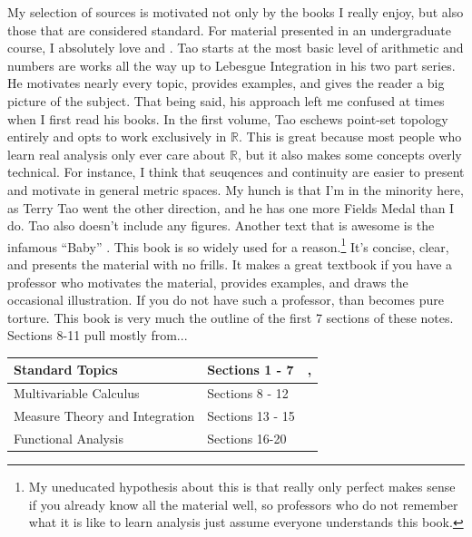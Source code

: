 \documentclass{article}
\newcommand{\R}{\mathbb{R}}
\theoremstyle{definition}
\begin{document}
	
	My selection of sources is motivated not only by the books I really enjoy, but also those that are considered standard. For material presented in an undergraduate course, I absolutely love \cite{tao2006analysis} and \cite{tao2009analysis}. Tao starts at the most basic level of arithmetic and numbers are works all the way up to Lebesgue Integration in his two part series. He motivates nearly every topic, provides examples, and gives the reader a big picture of the subject. That being said, his approach left me confused at times when I first read his books. In the first volume, Tao eschews point-set topology entirely and opts to work exclusively in $ \R $. This is great because most people who learn real analysis only ever care about $ \R $, but it also makes some concepts overly technical. For instance, I think that seuqences and continuity are easier to present and motivate in general metric spaces. My hunch is that I'm in the minority here, as Terry Tao went the other direction, and he has one more Fields Medal than I do. Tao also doesn't include any figures. Another text that is awesome is the infamous ``Baby'' \cite{rudin1964principles}. This book is so widely used for a reason.\footnote{My uneducated hypothesis about this is that \cite{rudin1964principles} really only perfect makes sense if you already know all the material well, so professors who do not remember what it is like to learn analysis just assume everyone understands this book.} It's concise, clear, and presents the material with no frills. It makes a great textbook if you have a professor who motivates the material, provides examples, and draws the occasional illustration. If you do not have such a professor, than \cite{rudin1964principles} becomes pure torture. This book is very much the outline of the first 7 sections of these notes. Sections 8-11 pull mostly from...
	

	\begin{table}[]
		\centering
		\begin{tabular}{|l|l|l|}
			\hline
			Standard Topics & Sections 1 - 7 &  \citet{tao2006analysis, tao2009analysis}, \cite{rudin}\\ \hline
			Multivariable Calculus & Sections 8 - 12 &  \\ \hline
			Measure Theory and Integration &  Sections 13 - 15&  \\ \hline
			Functional Analysis & Sections 16-20 &  \\ \hline
		\end{tabular}
	\end{table}
\end{document}
